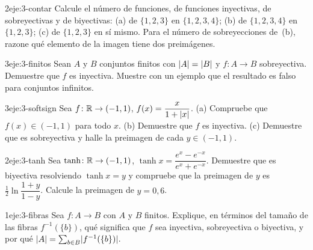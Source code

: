 \begin{ejercicio}{2}{eje:3-contar}
Calcule el número de funciones, de funciones inyectivas, de sobreyectivas y de biyectivas: (a) de $\{1,2,3\}$ en $\{1,2,3,4\}$; (b) de $\{1,2,3,4\}$ en $\{1,2,3\}$; (c) de $\{1,2,3\}$ en sí mismo. Para el número de sobreyecciones de~(b), razone qué elemento de la imagen tiene dos preimágenes.
\end{ejercicio}

\begin{ejercicio}{3}{eje:3-finitos}
Sean $A$ y $B$ conjuntos finitos con $\lvert A\rvert=\lvert B\rvert$ y $f\colon A\to B$ sobreyectiva. Demuestre que $f$ es inyectiva. Muestre con un ejemplo que el resultado es falso para conjuntos infinitos.
\end{ejercicio}

\begin{ejercicio}{3}{eje:3-softsign}
Sea $f\colon\mathbb{R}\to(-1,1)$, $f(x)=\dfrac{x}{1+\lvert x\rvert}$. (a) Compruebe que $f(x)\in(-1,1)$ para todo $x$. (b) Demuestre que $f$ es inyectiva. (c) Demuestre que es sobreyectiva y halle la preimagen de cada $y\in(-1,1)$.
\end{ejercicio}

\begin{ejercicio}{2}{eje:3-tanh}
Sea $\tanh\colon\mathbb{R}\to(-1,1)$, $\tanh x=\dfrac{e^{x}-e^{-x}}{e^{x}+e^{-x}}$. Demuestre que es biyectiva resolviendo $\tanh x=y$ y compruebe que la preimagen de $y$ es $\tfrac12\ln\dfrac{1+y}{1-y}$. Calcule la preimagen de $y=0{,}6$.
\end{ejercicio}

\begin{ejercicio}{1}{eje:3-fibras}
Sea $f\colon A\to B$ con $A$ y $B$ finitos. Explique, en términos del tamaño de las fibras $f^{-1}(\{b\})$, qué significa que $f$ sea inyectiva, sobreyectiva o biyectiva, y por qué $\lvert A\rvert=\sum_{b\in B}\lvert f^{-1}(\{b\})\rvert$.
\end{ejercicio}
